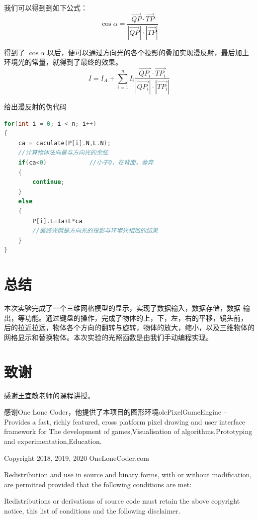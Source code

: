 \documentclass[12pt,oneside,a4paper]{ctexart}
\begin{document}
我们可以得到到如下公式：
\begin{equation*}
	\cos{\alpha} = \frac{\vec{QP} \cdot \vec{TP}}{\left\lvert \vec{QP} \right\rvert \cdot \left\lvert \vec{TP} \right\rvert }
\end{equation*}

得到了 $\cos{\alpha}$ 以后，便可以通过方向光的各个投影的叠加实现漫反射，最后加上环境光的常量，就得到了最终的效果。
\begin{equation*}
	I=I_{A}+\sum_{i = 1}^{n}I_{i}   \frac{\vec{QP_{i}} \cdot \vec{TP_{i}}}{\left\lvert \vec{QP_{i}} \right\rvert \cdot \left\lvert \vec{TP_{i}} \right\rvert }
\end{equation*}

给出漫反射的伪代码
\begin{lstlisting}[language=c++]
for(int i = 0; i < n; i++)
{
	ca = caculate(P[i].N,L.N);
	//计算物体法向量与方向光的余弦
	if(ca<0)			//小于0，在背面，舍弃
	{
		continue;
	}
	else
	{
		P[i].L=Ia+L*ca
		//最终光照是方向光的投影与环境光相加的结果
	}
}
\end{lstlisting}

\section{总结}
本次实验完成了一个三维网格模型的显示，实现了数据输入，数据存储，数据
输出，等功能。通过键盘的操作，完成了物体的上，下，左，右的平移，镜头前，
后的拉近拉远，物体各个方向的翻转与旋转，物体的放大，缩小，以及三维物体的
网格显示和替换物体。本次实验的光照函数是由我们手动编程实现。

\section*{致谢}
感谢王宜敏老师的课程讲授。

感谢One Lone Coder，他提供了本项目的图形环境olcPixelGameEngine -- Provides a fast, richly featured, cross platform pixel drawing and user interface framework for The development of games,Visualisation of algorithms,Prototyping and experimentation,Education.

Copyright 2018, 2019, 2020 OneLoneCoder.com

Redistribution and use in source and binary forms, with or without modification, are permitted provided that the following conditions are met:

Redistributions or derivations of source code must retain the above copyright notice, this list of conditions and the following disclaimer.
\end{document}

